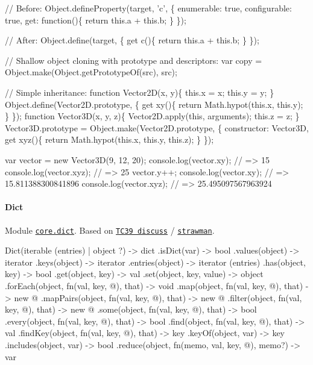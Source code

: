 \begin{DoxyCode}
// Before:
Object.defineProperty(target, 'c', \{
  enumerable: true,
  configurable: true,
  get: function()\{
    return this.a + this.b;
  \}
\});

// After:
Object.define(target, \{
  get c()\{
    return this.a + this.b;
  \}
\});

// Shallow object cloning with prototype and descriptors:
var copy = Object.make(Object.getPrototypeOf(src), src);

// Simple inheritance:
function Vector2D(x, y)\{
  this.x = x;
  this.y = y;
\}
Object.define(Vector2D.prototype, \{
  get xy()\{
    return Math.hypot(this.x, this.y);
  \}
\});
function Vector3D(x, y, z)\{
  Vector2D.apply(this, arguments);
  this.z = z;
\}
Vector3D.prototype = Object.make(Vector2D.prototype, \{
  constructor: Vector3D,
  get xyz()\{
    return Math.hypot(this.x, this.y, this.z);
  \}
\});

var vector = new Vector3D(9, 12, 20);
console.log(vector.xy);  // => 15
console.log(vector.xyz); // => 25
vector.y++;
console.log(vector.xy);  // => 15.811388300841896
console.log(vector.xyz); // => 25.495097567963924
\end{DoxyCode}
 \paragraph*{Dict}

Module \href{https://github.com/zloirock/core-js/blob/v2.6.0/modules/core.dict.js}{\tt {\ttfamily core.\+dict}}. Based on \href{https://github.com/rwaldron/tc39-notes/blob/master/es6/2012-11/nov-29.md#collection-apis-review}{\tt T\+C39 discuss} / \href{http://wiki.ecmascript.org/doku.php?id=harmony:modules_standard#dictionaries}{\tt strawman}. 
\begin{DoxyCode}
[new] Dict(iterable (entries) | object ?) -> dict
  .isDict(var) -> bool
  .values(object) -> iterator
  .keys(object) -> iterator
  .entries(object) -> iterator (entries)
  .has(object, key) -> bool
  .get(object, key) -> val
  .set(object, key, value) -> object
  .forEach(object, fn(val, key, @), that) -> void
  .map(object, fn(val, key, @), that) -> new @
  .mapPairs(object, fn(val, key, @), that) -> new @
  .filter(object, fn(val, key, @), that) -> new @
  .some(object, fn(val, key, @), that) -> bool
  .every(object, fn(val, key, @), that) -> bool
  .find(object, fn(val, key, @), that) -> val
  .findKey(object, fn(val, key, @), that) -> key
  .keyOf(object, var) -> key
  .includes(object, var) -> bool
  .reduce(object, fn(memo, val, key, @), memo?) -> var
\end{DoxyCode}



